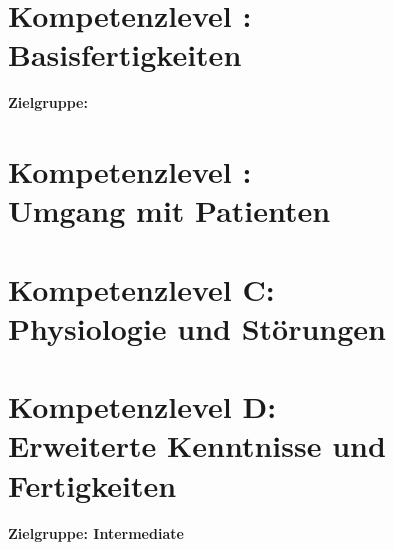 \documentclass[
ngerman,
paper=a4,
asymmetric,
fontsize=9.5pt,
draft=false,
numbers=noenddot,
footnotes=multiple,
toc=flat,
]{scrbook}
\begin{document}
\part{Kompetenzlevel : \\Basisfertigkeiten}
\setcounter{chapter}{100}

{\sffamily\noindent \textbf{Zielgruppe: }
}








\part{Kompetenzlevel : \\Umgang mit Patienten}
\setcounter{chapter}{200}




\part{Kompetenzlevel C: \\Physiologie und Störungen}
\setcounter{chapter}{300}



















\part{Kompetenzlevel D: \\Erweiterte Kenntnisse und Fertigkeiten}

{\sffamily\noindent \textbf{Zielgruppe: Intermediate}
}

\setcounter{chapter}{400}



\end{document}
